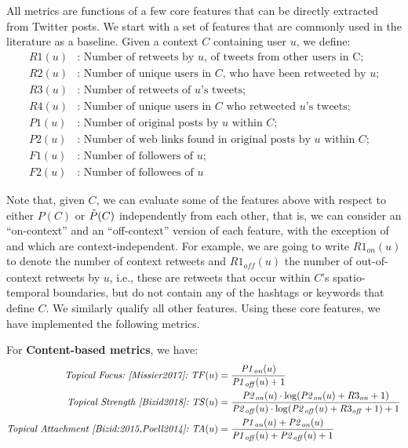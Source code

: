 All metrics are functions of a few core features that can be directly extracted from Twitter posts. 
We start with a set of features that are commonly used in the literature as a baseline.
Given a context $C$ containing user $u$, we define:
%
\begin{align*}
\mathit{R1}(u) &\text{: Number of retweets by $u$, of tweets from other users in C;}\\
\mathit{R2}(u)&\text{: Number of unique users in $C$, who have been retweeted by $u$;}\\
\mathit{R3}(u)&\text{: Number of retweets of $u$'s tweets;}\\
\mathit{R4}(u)&\text{: Number of unique users in $C$ who retweeted $u$'s tweets;}\\
\mathit{P1}(u)&\text{: Number of original posts by $u$ within $C$;}\\
\mathit{P2}(u)&\text{: Number of web links found in original posts by $u$ within $C$;} \\
\mathit{F1}(u)& \text{: Number of followers of $u$;}\\
\mathit{F2}(u)& \text{: Number of followees of $u$}
\end{align*}
%

Note that, given $C$, we can evaluate some of the features above with respect to either $P(C)$ or  $\Tilde{P}(C)$ independently from each other, that is, we can consider an ``on-context'' and an ``off-context'' version of each feature, with the exception of  and  which are context-independent.
%
For example, we are going to write $R1_{on}(u)$ to denote the number of context retweets and $R1_{\mathit{off}}(u)$ the number of out-of-context retweets by $u$, i.e., these are retweets that occur within $C$'s spatio-temporal boundaries, but do not contain any of the hashtags or keywords that define $C$.  
%
We similarly qualify all other features.
%
Using these core features, we have implemented the following metrics.

For \textbf{Content-based metrics}, we have:
\begin{align}
\textit{Topical Focus:~\cite{Missier2017}:} ~ \mathit{TF}(u) & =  \frac{\mathit{P1}_{\mathit{on}}(u)}{\mathit{P1}_{\mathit{off}}(u) +1}    \label{eq:TF}\\
\textit{Topical Strength~\cite{Bizid2018}:} ~\mathit{TS}(u) & =	\frac{\mathit{P2}_{\mathit{on}}(u) \cdot \log(\mathit{P2}_{\mathit{on}}(u) + R3_{\mathit{on}} +1 )}{\mathit{P2}_{\mathit{off}}(u) \cdot \log(\mathit{P2}_{\mathit{off}}(u) + R3_{\mathit{off}} +1 ) + 1}   \label{eq:TS} \\
\textit{Topical Attachment~\cite{Bizid:2015,Poell2014}:} ~\mathit{TA}(u) & = \frac{\mathit{P1}_{\mathit{on}}(u) + \mathit{P2}_{\mathit{on}}(u)}{\mathit{P1}_{\mathit{off}}(u) + \mathit{P2}_{\mathit{off}}(u) +1} \label{eq:TA}
\end{align}

